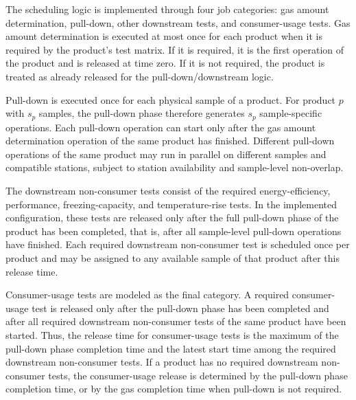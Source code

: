

The scheduling logic is implemented through four job categories: gas amount
determination, pull-down, other downstream tests, and consumer-usage tests. Gas
amount determination is executed at most once for each product when it is
required by the product's test matrix. If it is required, it is the first
operation of the product and is released at time zero. If it is not required,
the product is treated as already released for the pull-down/downstream logic.

Pull-down is executed once for each physical sample of a product. For product
\(p\) with \(s_p\) samples, the pull-down phase therefore generates \(s_p\)
sample-specific operations. Each pull-down operation can start only after the
gas amount determination operation of the same product has finished. Different
pull-down operations of the same product may run in parallel on different
samples and compatible stations, subject to station availability and
sample-level non-overlap.

The downstream non-consumer tests consist of the required energy-efficiency,
performance, freezing-capacity, and temperature-rise tests. In the implemented
configuration, these tests are released only after the full pull-down phase of
the product has been completed, that is, after all sample-level pull-down
operations have finished. Each required downstream non-consumer test is
scheduled once per product and may be assigned to any available sample of that
product after this release time.

Consumer-usage tests are modeled as the final category. A required
consumer-usage test is released only after the pull-down phase has been
completed and after all required downstream non-consumer tests of the same
product have been started. Thus, the release time for consumer-usage tests is
the maximum of the pull-down phase completion time and the latest start time
among the required downstream non-consumer tests. If a product has no required
downstream non-consumer tests, the consumer-usage release is determined by the
pull-down phase completion time, or by the gas completion time when pull-down
is not required.

